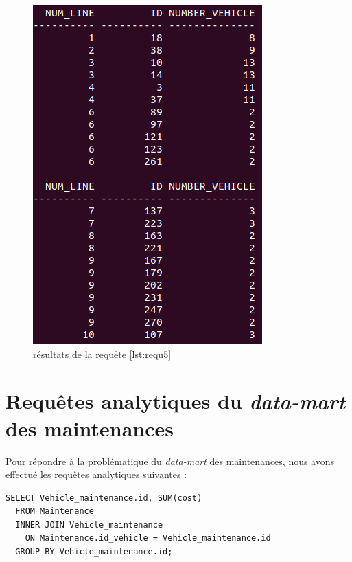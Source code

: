 \documentclass[a4paper,12pt]{report}
\begin{document}
\begin{figure}[!ht]
  \centering
  \includegraphics[scale=0.5]{images/requetes_analytiques/requ5.png}
  \caption{résultats de la requête \ref{lst:requ5}}
\end{figure}

\section{Requêtes analytiques du \textit{data-mart} des maintenances}
Pour répondre à la problématique du \textit{data-mart} des maintenances, nous avons effectué les requêtes analytiques suivantes :

\begin{lstlisting}[caption={le coût total de maintenance de chaque véhicule}, label={lst:requ6}]
  SELECT Vehicle_maintenance.id, SUM(cost)
  FROM Maintenance
  INNER JOIN Vehicle_maintenance
    ON Maintenance.id_vehicle = Vehicle_maintenance.id
  GROUP BY Vehicle_maintenance.id;
\end{lstlisting}
\end{document}
